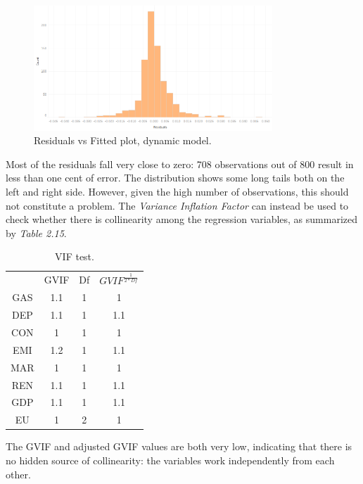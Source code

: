 \documentclass{book}
\begin{document}
\bigskip
\begin{figure}[H]
\begin{center}
\captionsetup{justification=centering}
\includegraphics[width=0.8\textwidth]{Images/disres.png}
\caption{Residuals vs Fitted plot, dynamic model.}
\end{center}
\end{figure}
\bigskip

Most of the residuals fall very close to zero: 708 observations out of 800 result in less than one cent of error. The distribution shows some long tails both on the left and right side. However, given the high number of observations, this should not constitute a problem. The \textit{Variance Inflation Factor} can instead be used to check whether there is collinearity among the regression variables, as summarized by \textit{Table 2.15}. 

\bigskip
\begin{table}[H]
\begin{center}
\begin{tabular}{|c|c|c|c|}
\hline
\rowcolor{maroon} \multicolumn{4}{|c|}{Variance Inflation Factor}\\
\hline
&GVIF&Df&$GVIF^{\frac{1}{2*Df}}$\\
\hline
GAS&1.1&1&1\\
DEP&1.1&1&1.1\\
CON&1&1&1\\
EMI&1.2&1&1.1\\
MAR&1&1&1\\
REN&1.1&1&1.1\\
GDP&1.1&1&1.1\\
EU&1&2&1\\
\hline
\end{tabular}
\caption{VIF test.}
\end{center}
\end{table}
\bigskip

The GVIF and adjusted GVIF values are both very low, indicating that there is no hidden source of collinearity: the variables work independently from each other.\\
\end{document}
